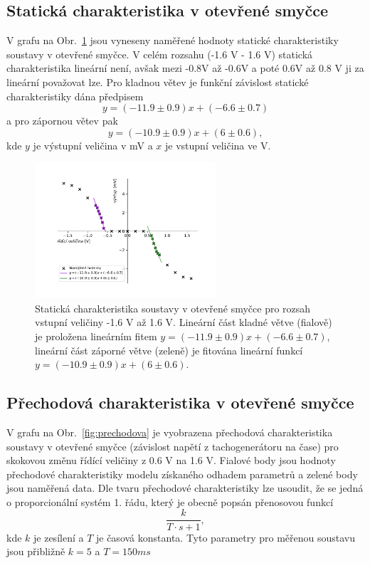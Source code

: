 	\subsection{Statická charakteristika v otevřené smyčce}
		V grafu na Obr.~\ref{fig:staticka} jsou vyneseny naměřené hodnoty statické charakteristiky soustavy v otevřené smyčce. 
		V celém rozsahu (-1.6 V - 1.6 V) statická charakteristika lineární není, avšak mezi -0.8V až -0.6V a poté 0.6V až 0.8 V ji za lineární považovat lze.
		Pro kladnou větev je funkční závislost statické charakteristiky dána předpisem $$y=(-11.9\pm 0.9)x+(-6.6\pm 0.7)$$ a pro zápornou větev pak $$y=(-10.9\pm 0.9)x+(6\pm 0.6),$$ 
		kde $y$ je výstupní veličina v mV a $x$ je vstupní veličina ve V. 
		\begin{figure}[H] 
			\centering
			\includegraphics[width=0.6\textwidth]{img/graf_staticka.pdf} 
			\caption{Statická charakteristika soustavy v otevřené smyčce pro rozsah vstupní veličiny -1.6 V až 1.6 V. 
			Lineární část kladné větve (fialově) je proložena lineárním fitem $y=(-11.9\pm 0.9)x+(-6.6\pm 0.7)$, 
			lineární část záporné větve (zeleně) je fitována lineární funkcí $y=(-10.9\pm 0.9)x+(6\pm 0.6)$.} 
			\label{fig:staticka}
		\end{figure}


	\subsection{Přechodová charakteristika v otevřené smyčce}
		V grafu na Obr.~\ref{fig:prechodova} je vyobrazena přechodová charakteristika soustavy v otevřené smyčce (závislost napětí z tachogenerátoru na čase) 
		pro skokovou změnu řídící veličiny z 0.6 V na 1.6 V. Fialové body jsou hodnoty přechodové charakteristiky modelu získaného odhadem parametrů a zelené body jsou naměřená data.
		Dle tvaru přechodové charakteristiky lze usoudit, že se jedná o proporcionální systém 1. řádu, který je obecně popsán přenosovou funkcí
		\begin{equation}
			\frac{k}{T\cdot s + 1},
		\end{equation}
		kde $k$ je zesílení a $T$ je časová konstanta. Tyto parametry pro měřenou soustavu jsou přibližně $k=5$ a $T=150\unit{ms}$

